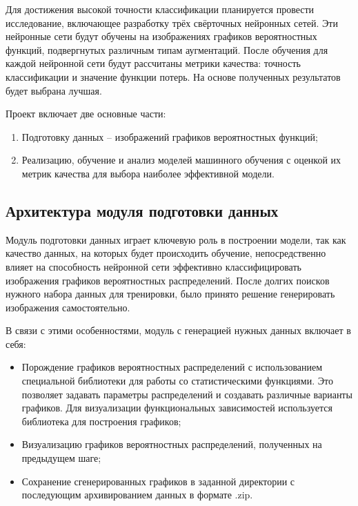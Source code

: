 \documentclass[14pt, russian]{scrartcl}
\begin{document}
Для достижения высокой точности классификации планируется провести исследование, включающее разработку трёх свёрточных нейронных сетей. Эти нейронные сети будут обучены на изображениях графиков вероятностных функций, подвергнутых различным типам аугментаций. После обучения для каждой нейронной сети будут рассчитаны метрики качества: точность классификации и значение функции потерь. На основе полученных результатов будет выбрана лучшая.

Проект включает две основные части:
\begin{enumerate} 
    \item Подготовку данных -- изображений графиков вероятностных функций;
    \item Реализацию, обучение и анализ моделей машинного обучения с оценкой их метрик качества для выбора наиболее эффективной модели.
\end{enumerate}

\subsection{Архитектура модуля подготовки данных}
Модуль подготовки данных играет ключевую роль в построении модели, так как качество данных, на которых будет происходить обучение, непосредственно влияет на способность нейронной сети эффективно классифицировать изображения графиков вероятностных распределений. После долгих поисков нужного набора данных для тренировки, было принято решение генерировать изображения самостоятельно. 

В связи с этими особенностями, модуль с генерацией нужных данных включает в себя:
\begin{itemize}
    \item Порождение графиков вероятностных распределений с использованием специальной библиотеки для работы со статистическими функциями. Это позволяет задавать параметры распределений и создавать различные варианты графиков. Для визуализации функциональных зависимостей используется библиотека для построения графиков;
    \item Визуализацию графиков вероятностных распределений, полученных на предыдущем шаге;
    \item Сохранение сгенерированных графиков в заданной директории с последующим архивированием данных в формате .zip.
\end{itemize}

\end{document}
